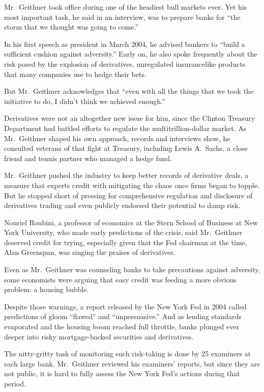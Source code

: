\documentclass[12pt,a4paper,onecolumn]{article}
\begin{document}
Mr.~Geithner took office during one of the headiest bull markets ever. Yet his most important task,
he said in an interview, was to prepare banks for ``the storm that we thought was going to come.''

In his first speech as president in March 2004, he advised bankers to ``build a sufficient cushion
against adversity.'' Early on, he also spoke frequently about the risk posed by the explosion of
derivatives, unregulated insurancelike products that many companies use to hedge their bets.

But Mr.~Geithner acknowledges that ``even with all the things that we took the initiative to do, I
didn't think we achieved enough.''

Derivatives were not an altogether new issue for him, since the Clinton Treasury Department had
battled efforts to regulate the multitrillion-dollar market. As Mr.~Geithner shaped his own
approach, records and interviews show, he consulted veterans of that fight at Treasury, including
Lewis A.~Sachs, a close friend and tennis partner who managed a hedge fund.

Mr.~Geithner pushed the industry to keep better records of derivative deals, a measure that experts
credit with mitigating the chaos once firms began to topple. But he stopped short of pressing for
comprehensive regulation and disclosure of derivatives trading and even publicly endorsed their
potential to damp risk.

Nouriel Roubini, a professor of economics at the Stern School of Business at New York University,
who made early predictions of the crisis, said Mr.~Geithner deserved credit for trying, especially
given that the Fed chairman at the time, Alan Greenspan, was singing the praises of derivatives.

Even as Mr.~Geithner was counseling banks to take precautions against adversity, some economists
were arguing that easy credit was feeding a more obvious problem: a housing bubble.

Despite those warnings, a report released by the New York Fed in 2004 called predictions of gloom
``flawed'' and ``unpersuasive.'' And as lending standards evaporated and the housing boom reached
full throttle, banks plunged ever deeper into risky mortgage-backed securities and derivatives.

The nitty-gritty task of monitoring such risk-taking is done by 25 examiners at each large bank.
Mr.~Geithner reviewed his examiners' reports, but since they are not public, it is hard to fully
assess the New York Fed's actions during that period.
\end{document}
